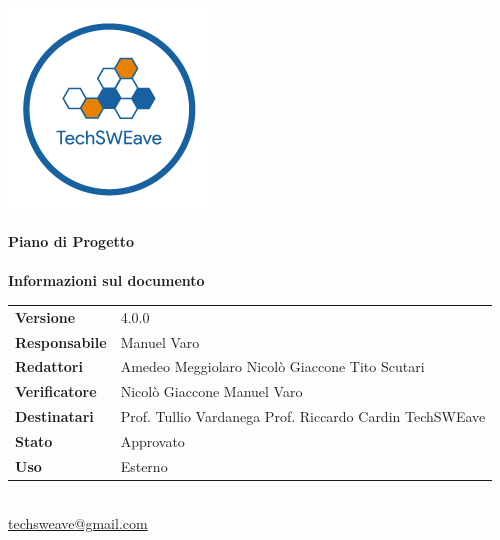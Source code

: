 \documentclass[a4paper]{article}
\begin{document}
\begin{titlepage}
    \begin{center}
        \includegraphics{../../../Images/logo}\\
        \vspace{20px}
        \textcolor{logo}{\hrulefill}\\
        \vspace{20px}
        \textbf{\huge\textcolor{logo}{Piano di Progetto}}\\
        \vspace{10px}
        \textcolor{logo}{\hrulefill}\\
        \vspace{40px}
        \textbf{\Large Informazioni sul documento}\\
        \vspace{20px}
        \begin{tabular}{p{100px} | p{100px}}
            \textbf{Versione}     & 4.0.0                                                                     \\
            \textbf{Responsabile} & Manuel Varo                                                               \\
            \textbf{Redattori}    & Amedeo Meggiolaro \newline Nicolò Giaccone \newline Tito Scutari          \\
            \textbf{Verificatore} & Nicolò Giaccone \newline Manuel Varo                                      \\
            \textbf{Destinatari}  & Prof. Tullio Vardanega \newline Prof. Riccardo Cardin \newline TechSWEave \\
            \textbf{Stato}        & Approvato                                                                 \\
            \textbf{Uso}          & Esterno                                                                   \\
        \end{tabular}\\
        \vspace{60px}
        \href{mailto:techsweave@gmail.com}{techsweave@gmail.com}\\

    \end{center}
\end{titlepage}
\end{document}
